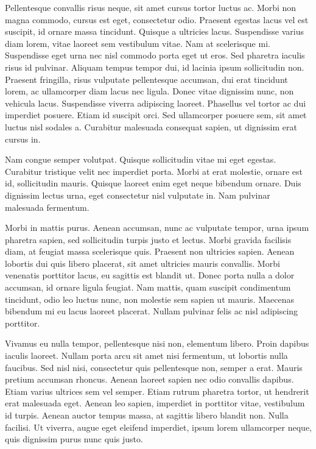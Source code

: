 Pellentesque convallis risus neque, sit amet cursus tortor luctus ac. Morbi non magna commodo, cursus est eget, consectetur odio. Praesent egestas lacus vel est suscipit, id ornare massa tincidunt. Quisque a ultricies lacus. Suspendisse varius diam lorem, vitae laoreet sem vestibulum vitae. Nam at scelerisque mi. Suspendisse eget urna nec nisl commodo porta eget ut eros. Sed pharetra iaculis risus id pulvinar. Aliquam tempus tempor dui, id lacinia ipsum sollicitudin non. Praesent fringilla, risus vulputate pellentesque accumsan, dui erat tincidunt lorem, ac ullamcorper diam lacus nec ligula. Donec vitae dignissim nunc, non vehicula lacus. Suspendisse viverra adipiscing laoreet. Phasellus vel tortor ac dui imperdiet posuere. Etiam id suscipit orci. Sed ullamcorper posuere sem, sit amet luctus nisl sodales a. Curabitur malesuada consequat sapien, ut dignissim erat cursus in.

Nam congue semper volutpat. Quisque sollicitudin vitae mi eget egestas. Curabitur tristique velit nec imperdiet porta. Morbi at erat molestie, ornare est id, sollicitudin mauris. Quisque laoreet enim eget neque bibendum ornare. Duis dignissim lectus urna, eget consectetur nisl vulputate in. Nam pulvinar malesuada fermentum.

Morbi in mattis purus. Aenean accumsan, nunc ac vulputate tempor, urna ipsum pharetra sapien, sed sollicitudin turpis justo et lectus. Morbi gravida facilisis diam, at feugiat massa scelerisque quis. Praesent non ultricies sapien. Aenean lobortis dui quis libero placerat, sit amet ultricies mauris convallis. Morbi venenatis porttitor lacus, eu sagittis est blandit ut. Donec porta nulla a dolor accumsan, id ornare ligula feugiat. Nam mattis, quam suscipit condimentum tincidunt, odio leo luctus nunc, non molestie sem sapien ut mauris. Maecenas bibendum mi eu lacus laoreet placerat. Nullam pulvinar felis ac nisl adipiscing porttitor.

Vivamus eu nulla tempor, pellentesque nisi non, elementum libero. Proin dapibus iaculis laoreet. Nullam porta arcu sit amet nisi fermentum, ut lobortis nulla faucibus. Sed nisl nisi, consectetur quis pellentesque non, semper a erat. Mauris pretium accumsan rhoncus. Aenean laoreet sapien nec odio convallis dapibus. Etiam varius ultrices sem vel semper. Etiam rutrum pharetra tortor, ut hendrerit erat malesuada eget. Aenean leo sapien, imperdiet in porttitor vitae, vestibulum id turpis. Aenean auctor tempus massa, at sagittis libero blandit non. Nulla facilisi. Ut viverra, augue eget eleifend imperdiet, ipsum lorem ullamcorper neque, quis dignissim purus nunc quis justo.

